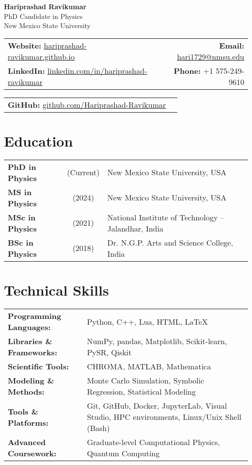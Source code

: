 \documentclass[11pt]{article}
\begin{document}
\begin{center}
    \textbf{\Huge Hariprashad Ravikumar} \\
    \vspace{0.5em}
    PhD Candidate in Physics\\
    New Mexico State University \\
\end{center}

\begin{tabularx}{\textwidth}{@{}Xr@{}}
    \textbf{Website:} \href{https://hariprashad-ravikumar.github.io}{hariprashad-ravikumar.github.io} & \textbf{Email:} \href{mailto:hari1729@nmsu.edu}{hari1729@nmsu.edu}  \\
    \textbf{LinkedIn:} \href{https://www.linkedin.com/in/hariprashad-ravikumar}{linkedin.com/in/hariprashad-ravikumar} & \textbf{Phone:} +1 575-249-9610 
\end{tabularx}
\vspace{-1em}
\begin{tabularx}{\textwidth}{@{}Xr@{}}
\textbf{GitHub:} \href{https://github.com/Hariprashad-Ravikumar}{github.com/Hariprashad-Ravikumar}  \\
\end{tabularx}

\vspace{0.5em}
\section*{Education}
\vspace{-0.7em}
\begin{tabularx}{\textwidth}{@{}lcX@{}}
    \textbf{PhD in Physics} & (Current) & New Mexico State University, USA \\
    \textbf{MS in Physics} & (2024) & New Mexico State University, USA \\
    \textbf{MSc in Physics} & (2021) & National Institute of Technology – Jalandhar, India \\
    \textbf{BSc in Physics} & (2018) &  Dr. N.G.P. Arts and Science College, India
\end{tabularx}

\section*{Technical Skills}
\vspace{-0.5em}
\begin{tabularx}{\textwidth}{@{}lX@{}}
\textbf{Programming Languages:} & Python, C++, Lua, HTML, \LaTeX \\
\textbf{Libraries \& Frameworks:} & NumPy, pandas, Matplotlib, Scikit-learn, PySR, Qiskit \\
\textbf{Scientific Tools:} & CHROMA, MATLAB, Mathematica \\
\textbf{Modeling \& Methods:} & Monte Carlo Simulation, Symbolic Regression, Statistical Modeling\\
\textbf{Tools \& Platforms:} & Git, GitHub, Docker, JupyterLab, Visual Studio, HPC environments, Linux/Unix Shell (Bash) \\
\textbf{Advanced Coursework:} & Graduate-level Computational Physics, Quantum Computing
\end{tabularx}
\end{document}
